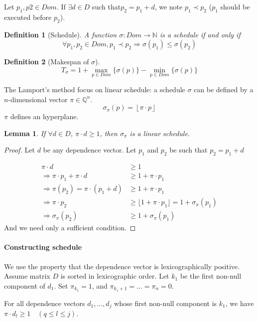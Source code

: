 \documentclass{article}
\newtheorem{lemma}{Lemma}
\newtheorem{defi}{Definition}
\begin{document}
Let $p_1,p2 \in Dom$. If $\exists d \in D$ such that$p_2=p_1 + d$, we note $p_1 \prec p_2$ ($p_1$ should be executed before $p_2$).

\begin{defi}[Schedule]
A function $\sigma : Dom \to \mathbb{N}$ is a schedule if and only if
\[\forall p_1,p_2 \in Dom, p_1\prec p_2 \Rightarrow \sigma(p_1)\leq \sigma(p_2)\]
\end{defi}

\begin{defi}[Makespan of $\sigma$]
\[T_{\sigma}=1+\max_{p\in Dom} \{ \sigma(p)\} - \min_{p\in Dom}\{ \sigma(p)\}\]
\end{defi}

The Lamport's method focus on linear schedule: a schedule $\sigma$ can be defined by a $n$-dimensional vector $\pi \in \mathbb{Q}^n$.
\[\sigma_\pi(p) = \left\lfloor \pi \cdot p \right\rfloor\]
$\pi$ defines an hyperplane.

\begin{lemma}
If $\forall d\in D$, $\pi\cdot d \geq 1$, then $\sigma_\pi$ is a linear schedule.
\end{lemma}

\begin{proof}
Let $d$ be any dependence vector. Let $p_1$ and $p_2$ be such that $p_2=p_1+d$

\begin{align*}
\pi \cdot d & \geq 1\\
\Rightarrow \pi\cdot p_1 + \pi \cdot d & \geq 1 + \pi \cdot p_1\\
\Rightarrow \pi(p_2)=\pi\cdot(p_1+d) & \geq 1 + \pi \cdot p_1\\
\Rightarrow \pi\cdot p_2 & \geq \lfloor 1 + \pi \cdot p_1 \rfloor = 1 + \sigma_\pi(p_1)\\
\Rightarrow \sigma_\pi(p_2) & \geq 1 + \sigma_\pi(p_1)
\end{align*}
And we need only a sufficient condition.
\end{proof}

\paragraph{Constructing schedule}
We use the property that the dependence vector is lexicographically positive. Assume matrix $D$ is sorted in lexicographic order. Let $k_1$ be the first non-null component of $d_1$. Set $\pi_{k_1}=1$, and $\pi_{k_{1}+1}=...=\pi_n=0$.

For all dependence vectors $d_1,...,d_j$ whose first non-null component is $k_1$, we have $\pi \cdot d_l \geq 1\quad (q\leq l \leq j)$.
\end{document}
